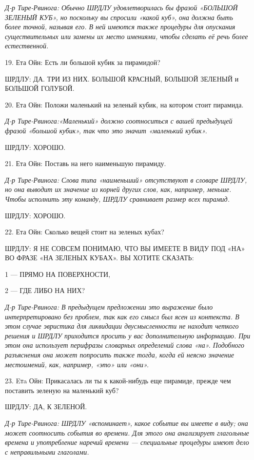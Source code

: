 \documentclass[../main.tex]{subfiles}
\begin{document}
\begin{dialogue}
\emph{Д-р Тире-Рвинога: Обычно ШРДЛУ удовлетворилась бы фразой «БОЛЬШОЙ ЗЕЛЕНЫЙ КУБ», но поскольку вы спросили «какой куб», она должна быть более точной, называя его. В ней имеются также процедуры для опускания существительных или замены их место имениями, чтобы сделать её речь более естественной.}

19. Ета Ойн: Есть ли большой кубик за пирамидой?

ШРДЛУ: ДА. ТРИ ИЗ НИХ. БОЛЬШОЙ КРАСНЫЙ, БОЛЬШОЙ ЗЕЛЕНЫЙ и БОЛЬШОЙ ГОЛУБОЙ.

20. Ета Ойн: Положи маленький на зеленый кубик, на котором стоит пирамида.

\emph{Д-р Тире-Рвинога:«Маленький» должно соотноситься с вашей предыдущей фразой «большой кубик», так что это значит «маленький кубик».}

ШРДЛУ: ХОРОШО.

21. Ета Ойн: Поставь на него наименьшую пирамиду.

\emph{Д-р Тире-Рвинога: Слова типа «наименьший» отсутствуют в словаре ШРДЛУ, но она выводит их значение из корней других слов, как, например, меньше. Чтобы исполнить эту команду, ШРДЛУ сравнивает размер всех пирамид.}

ШРДЛУ: ХОРОШО.

22. Ета Ойн: Сколько вещей стоит на зеленых кубах?

ШРДЛУ: Я НЕ СОВСЕМ ПОНИМАЮ, ЧТО ВЫ ИМЕЕТЕ В ВИДУ ПОД «НА» ВО ФРАЗЕ «НА ЗЕЛЕНЫХ КУБАХ». ВЫ ХОТИТЕ СКАЗАТЬ:

1 --- ПРЯМО НА ПОВЕРХНОСТИ,

2 --- ГДЕ ЛИБО НА НИХ?

\emph{Д-р Тире-Рвинога: В предыдущем предложении это выражение было интерпретировано без проблем, так как его смысл был ясен из контекста. В этом случае эвристика для ликвидации двусмысленности не находит четкого решения и ШРДЛУ приходится просить у вас дополнительную информацию. При этом она использует перифразы словарных определений слова «на». Подобного разъяснения она может попросить также тогда, когда ей неясно значение местоимений, как, например, «это» или «они».}

23. Eтa Ойн: Прикасалась ли ты к какой-нибудь еще пирамиде, прежде чем поставить зеленую на маленький куб?

ШРДЛУ: ДА, К ЗЕЛЕНОЙ.

\emph{Д-р Тире-Рвинога: ШРДЛУ «вспоминает», какое событие вы имеете в виду; она может соотносить события во времени. Для этого она анализирует глагольные времена и употребление наречий времени --- специальные процедуры имеют дело с неправильными глаголами.}


\end{dialogue}
\end{document}
